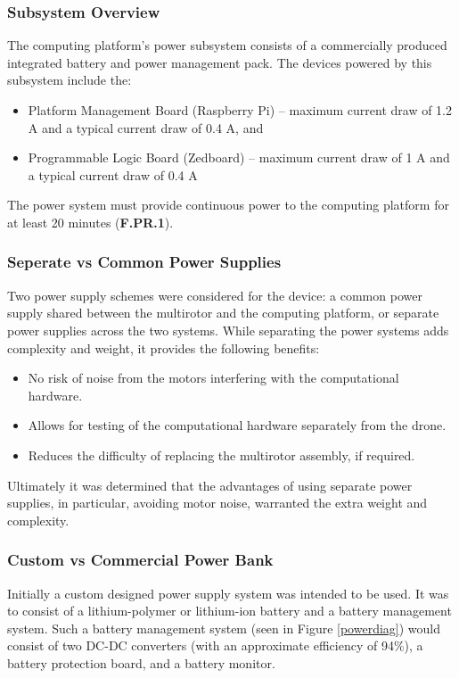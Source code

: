 \subsubsection{Subsystem Overview}
The computing platform's power subsystem consists of a commercially produced integrated battery and power management pack. The devices powered by this subsystem include the:

\begin{itemize}
\item Platform Management Board (Raspberry Pi) -- maximum current draw of 1.2 A and a typical current draw of 0.4 A, and
\item Programmable Logic Board (Zedboard) -- maximum current draw of 1 A and a typical current draw of 0.4 A
\end{itemize}

The power system must provide continuous power to the computing platform for at least 20 minutes (\textbf{F.PR.1}).

\subsubsection{Seperate vs Common Power Supplies}
Two power supply schemes were considered for the device: a common power supply shared between the multirotor and the computing platform, or separate power supplies across the two systems. While separating the power systems adds complexity and weight, it provides the following benefits:

\begin{itemize}
    \item No risk of noise from the motors interfering with the computational hardware.
    \item Allows for testing of the computational hardware separately from the drone.
    \item Reduces the difficulty of replacing the multirotor assembly, if required.
\end{itemize}

Ultimately it was determined that the advantages of using separate power supplies, in particular, avoiding motor noise, warranted the extra weight and complexity.

\subsubsection{Custom vs Commercial Power Bank}
Initially a custom designed power supply system was intended to be used. It was to consist of a lithium-polymer or lithium-ion battery and a battery management system. Such a battery management system (seen in Figure \ref{powerdiag}) would consist of two DC-DC converters (with an approximate efficiency of 94\%), a battery protection board, and a battery monitor. 

